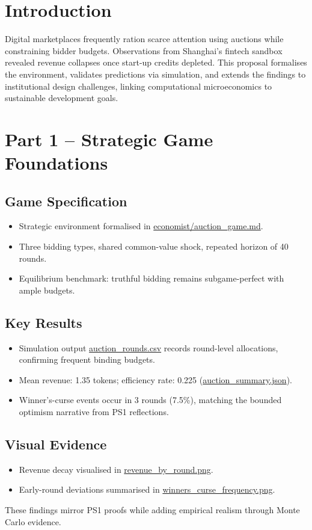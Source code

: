 \documentclass[11pt]{article}
\begin{document}
\section{Introduction}
Digital marketplaces frequently ration scarce attention using auctions while constraining bidder budgets. Observations from Shanghai's fintech sandbox revealed revenue collapses once start-up credits depleted. This proposal formalises the environment, validates predictions via simulation, and extends the findings to institutional design challenges, linking computational microeconomics to sustainable development goals.

\section{Part 1 -- Strategic Game Foundations}
\subsection{Game Specification}
\begin{itemize}[leftmargin=*]
  \item Strategic environment formalised in \href{../economist/auction_game.md}{economist/auction\_game.md}.
  \item Three bidding types, shared common-value shock, repeated horizon of 40 rounds.
  \item Equilibrium benchmark: truthful bidding remains subgame-perfect with ample budgets.
\end{itemize}

\subsection{Key Results}
\begin{itemize}[leftmargin=*]
  \item Simulation output \href{../computational_scientist/results/auction_rounds.csv}{auction\_rounds.csv} records round-level allocations, confirming frequent binding budgets.
  \item Mean revenue: 1.35 tokens; efficiency rate: 0.225 (\href{../computational_scientist/results/auction_summary.json}{auction\_summary.json}).
  \item Winner's-curse events occur in 3 rounds (7.5\%), matching the bounded optimism narrative from PS1 reflections.
\end{itemize}

\subsection{Visual Evidence}
\begin{itemize}[leftmargin=*]
  \item Revenue decay visualised in \href{../visualizations/auctions/revenue_by_round.png}{revenue\_by\_round.png}.
  \item Early-round deviations summarised in \href{../visualizations/auctions/winners_curse_frequency.png}{winners\_curse\_frequency.png}.
\end{itemize}
These findings mirror PS1 proofs while adding empirical realism through Monte Carlo evidence.
\end{document}
